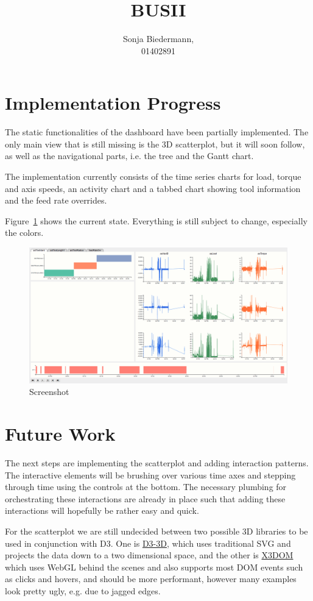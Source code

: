 \documentclass[english]{scrartcl}
\begin{document}
\title{BUSII}

\author{Sonja Biedermann,\\01402891}

\maketitle
\tableofcontents

\section{Implementation Progress}

The static functionalities of the dashboard have been partially implemented.
The only main view that is still missing is the 3D scatterplot, but it will soon
follow, as well as the navigational parts, i.e. the tree and the Gantt chart.

The implementation currently consists of the time series charts for load, torque
and axis speeds, an activity chart and a tabbed chart showing tool information and
the feed rate overrides.

Figure~\ref{fig:screen} shows the current state. Everything is still subject to change,
especially the colors.

\begin{figure}[tb]
    \centering
    \includegraphics[width=\textwidth]{screen}
    \caption{Screenshot}
    \label{fig:screen}
\end{figure}

\section{Future Work}

The next steps are implementing the scatterplot and adding interaction patterns.
The interactive elements will be brushing over various time axes and stepping
through time using the controls at the bottom. The necessary plumbing for orchestrating
these interactions are already in place such that adding these interactions will
hopefully be rather easy and quick.

For the scatterplot we are still undecided between two possible 3D libraries to
be used in conjunction with D3. One is
\href{https://github.com/Niekes/d3-3d}{D3-3D}, which uses traditional SVG and
projects the data down to a two dimensional space, and the other is
\href{https://www.x3dom.org/}{X3DOM} which uses WebGL behind the scenes and
also supports most DOM events such as clicks and hovers, and should be more
performant, however many examples look pretty ugly, e.g. due to jagged edges.
\end{document}
